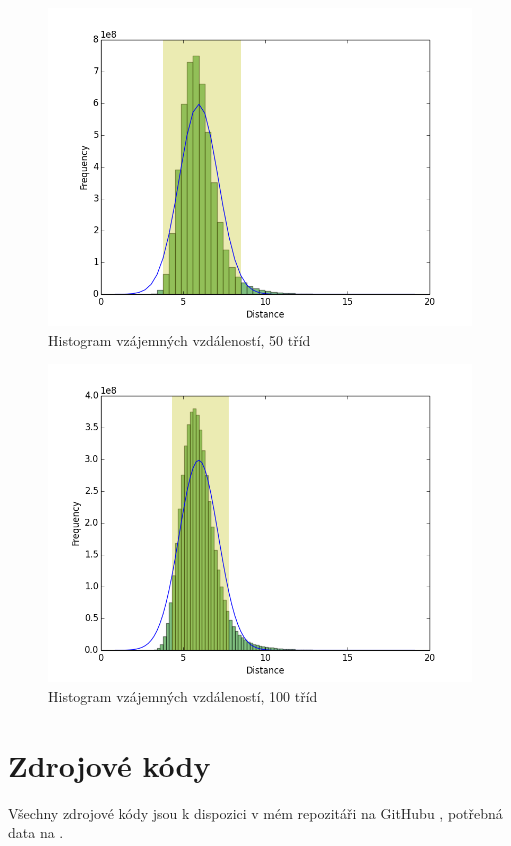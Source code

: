 \documentclass[fleqn,11pt]{article}
\begin{document}
    \begin{figure}[htp]
        \footnotesize
        \centering
        \caption*{Histogram vzájemných vzdáleností, 50 tříd}
        \includegraphics[width=13cm]{figures/enwiki-99k-50bins.png}
    \end{figure}

    \begin{figure}[htp]
        \footnotesize
        \centering
        \caption*{Histogram vzájemných vzdáleností, 100 tříd}
        \includegraphics[width=13cm]{figures/enwiki-99k-100bins.png}
    \end{figure}

    \section{Zdrojové kódy}
    Všechny zdrojové kódy jsou k dispozici v mém repozitáři na GitHubu \cite{ghrepo}, potřebná data na \cite{data}.

    \renewcommand\refname{\section{Reference}}
    
    
\end{document}
